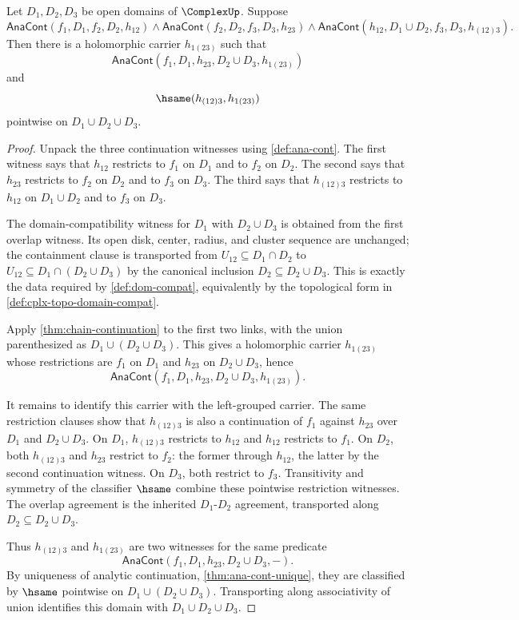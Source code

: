 \begin{theorem}
\label{thm:ana-cont-triple-chain-associativity}
Let $D_1,D_2,D_3$ be open domains of $\ComplexUp$. Suppose
$$
\mathsf{AnaCont}(f_1,D_1,f_2,D_2,h_{12})\land
\mathsf{AnaCont}(f_2,D_2,f_3,D_3,h_{23})\land
\mathsf{AnaCont}(h_{12},D_1\cup D_2,f_3,D_3,h_{(12)3}).
$$
Then there is a holomorphic carrier $h_{1(23)}$ such that
$$
\mathsf{AnaCont}(f_1,D_1,h_{23},D_2\cup D_3,h_{1(23)})
$$
and
$$
\hsame(h_{(12)3},h_{1(23)})
$$
pointwise on $D_1\cup D_2\cup D_3$.
\end{theorem}
\begin{proof}
Unpack the three continuation witnesses using \autoref{def:ana-cont}. The first witness says that $h_{12}$ restricts to $f_1$ on $D_1$ and to $f_2$ on $D_2$. The second says that $h_{23}$ restricts to $f_2$ on $D_2$ and to $f_3$ on $D_3$. The third says that $h_{(12)3}$ restricts to $h_{12}$ on $D_1\cup D_2$ and to $f_3$ on $D_3$.

The domain-compatibility witness for $D_1$ with $D_2\cup D_3$ is obtained from the first overlap witness. Its open disk, center, radius, and cluster sequence are unchanged; the containment clause is transported from $U_{12}\subseteq D_1\cap D_2$ to $U_{12}\subseteq D_1\cap(D_2\cup D_3)$ by the canonical inclusion $D_2\subseteq D_2\cup D_3$. This is exactly the data required by \autoref{def:dom-compat}, equivalently by the topological form in \autoref{def:cplx-topo-domain-compat}.

Apply \autoref{thm:chain-continuation} to the first two links, with the union parenthesized as $D_1\cup(D_2\cup D_3)$. This gives a holomorphic carrier $h_{1(23)}$ whose restrictions are $f_1$ on $D_1$ and $h_{23}$ on $D_2\cup D_3$, hence
$$
\mathsf{AnaCont}(f_1,D_1,h_{23},D_2\cup D_3,h_{1(23)}).
$$

It remains to identify this carrier with the left-grouped carrier. The same restriction clauses show that $h_{(12)3}$ is also a continuation of $f_1$ against $h_{23}$ over $D_1$ and $D_2\cup D_3$. On $D_1$, $h_{(12)3}$ restricts to $h_{12}$ and $h_{12}$ restricts to $f_1$. On $D_2$, both $h_{(12)3}$ and $h_{23}$ restrict to $f_2$: the former through $h_{12}$, the latter by the second continuation witness. On $D_3$, both restrict to $f_3$. Transitivity and symmetry of the classifier $\hsame$ combine these pointwise restriction witnesses. The overlap agreement is the inherited $D_1$-$D_2$ agreement, transported along $D_2\subseteq D_2\cup D_3$.

Thus $h_{(12)3}$ and $h_{1(23)}$ are two witnesses for the same predicate
$$
\mathsf{AnaCont}(f_1,D_1,h_{23},D_2\cup D_3,-).
$$
By uniqueness of analytic continuation, \autoref{thm:ana-cont-unique}, they are classified by $\hsame$ pointwise on $D_1\cup(D_2\cup D_3)$. Transporting along associativity of union identifies this domain with $D_1\cup D_2\cup D_3$.
\end{proof}

